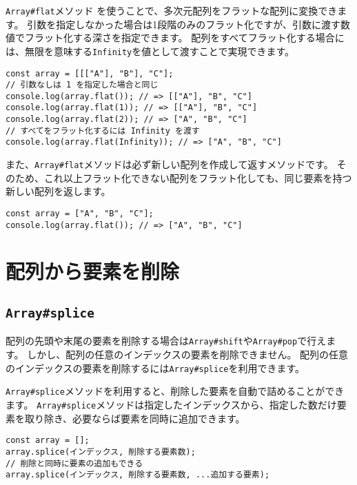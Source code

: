 \texttt{Array\#flat}メソッド\,\protect{}\,を使うことで、多次元配列をフラットな配列に変換できます。
引数を指定しなかった場合は1段階のみのフラット化ですが、引数に渡す数値でフラット化する深さを指定できます。
配列をすべてフラット化する場合には、無限を意味する\texttt{Infinity}を値として渡すことで実現できます。

\begin{lstlisting}
const array = [[["A"], "B"], "C"];
// 引数なしは 1 を指定した場合と同じ
console.log(array.flat()); // => [["A"], "B", "C"]
console.log(array.flat(1)); // => [["A"], "B", "C"]
console.log(array.flat(2)); // => ["A", "B", "C"]
// すべてをフラット化するには Infinity を渡す
console.log(array.flat(Infinity)); // => ["A", "B", "C"]
\end{lstlisting}

また、\texttt{Array\#flat}メソッドは必ず新しい配列を作成して返すメソッドです。
そのため、これ以上フラット化できない配列をフラット化しても、同じ要素を持つ新しい配列を返します。

\begin{lstlisting}
const array = ["A", "B", "C"];
console.log(array.flat()); // => ["A", "B", "C"]
\end{lstlisting}

\hypertarget{delete-element}{%
\section{配列から要素を削除}\label{delete-element}}

\hypertarget{splice}{%
\subsection{\texorpdfstring{\texttt{Array\#splice}}{Array\#splice}}\label{splice}}

配列の先頭や末尾の要素を削除する場合は\texttt{Array\#shift}や\texttt{Array\#pop}で行えます。
しかし、配列の任意のインデックスの要素を削除できません。
配列の任意のインデックスの要素を削除するには\texttt{Array\#splice}を利用できます。

\texttt{Array\#splice}メソッドを利用すると、削除した要素を自動で詰めることができます。
\texttt{Array\#splice}メソッドは指定したインデックスから、指定した数だけ要素を取り除き、必要ならば要素を同時に追加できます。

\begin{lstlisting}
const array = [];
array.splice(インデックス, 削除する要素数);
// 削除と同時に要素の追加もできる
array.splice(インデックス, 削除する要素数, ...追加する要素);
\end{lstlisting}

